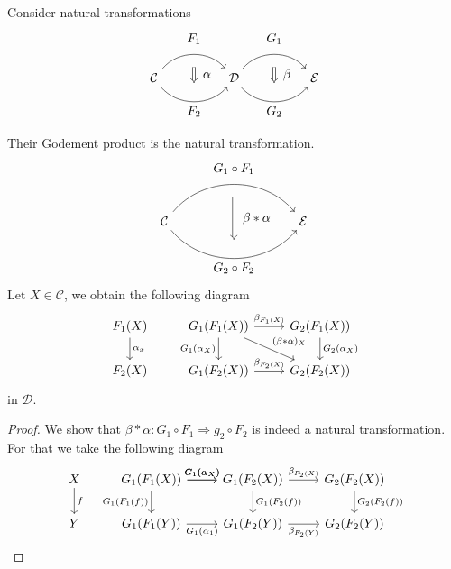 \begin{defi/prop}
    Consider natural transformations 
    \[
    \begin{tikzcd}[column sep=huge]	
    \mathcal{C}
    	\arrow[bend left=50]{r}[name=U,label=above:$F_1$]{}
    	\arrow[bend right=50]{r}[name=D,label=below:$F_2$]{}
    &
    \mathcal{D}
    \arrow[shorten <=10pt,shorten >=10pt,Rightarrow,to path={(U) -- node[label=right:$\alpha$] {} (D)}]{}
    	\arrow[bend left=50]{r}[name=U',label=above:$G_1$]{}
    	\arrow[bend right=50]{r}[name=D',label=below:$G_2$]{}
	&
	\mathcal{E} 
    \arrow[shorten <=10pt,shorten >=10pt,Rightarrow,to path={(U') -- node[label=right:$\beta$] {} (D')}]{}    	
    \end{tikzcd}
    \]
    
    Their Godement product is the natural transformation.
    \[
    \begin{tikzcd}[column sep=huge]	
    \mathcal{ C }
    	\arrow[bend left=50]{rr}[name=U,label=above:$G_1 \circ F_1$]{}
    	\arrow[bend right=50]{rr}[name=D,label=below:$G_2 \circ F_2$]{}
    &&
    \mathcal{E}
    \arrow[shorten <=10pt,shorten >=10pt,Rightarrow,to path={(U) -- node[label=right:$\beta * \alpha$] {} (D)}]{}
    \end{tikzcd}	
    \]
    Let $ X \in \mathcal{ C } $, we obtain the following diagram
    \[
    \begin{tikzcd}
        F_1 ( X ) 
        \ar[d, " \alpha_x "]
        &
        G_1 ( F_1 ( X ) ) 
        \ar[d, " G_1 ( \alpha_X ) "']
        \ar[rd, " {( \beta * \alpha )_X} "]
        \ar[r , " \beta_{ F_1 ( X ) } "]
        & 
        G_2 ( F_1 ( X ) )
        \ar[d, " G_2 ( \alpha_X ) "]
        \\
        F_2 ( X ) 
        &
        G_1 ( F_2 ( X ) ) 
        \ar[ r, " \beta_{ F_2 ( X ) }"]
        &
        G_2 ( F_2 ( X ) ) 
    \end{tikzcd}    
    \]
    in $ \mathcal{ D } $.
\end{defi/prop}

\begin{proof}
    We show that $ \beta * \alpha \colon G_1 \circ F_1 \Rightarrow g_2 \circ F_2 $ is indeed a natural transformation. 
    For that we take the following diagram 
     \[
     \begin{tikzcd}
         X
         \ar[d, "f"]
         &
         G_1 ( F_1 ( X ) ) 
         \ar[r , " G_1 ( \alpha_X ) "]
         \ar[r, " G_1 ( \alpha_X ) "]
         \ar[d, " G_1 ( F_1 ( f ) ) "']
         &
         G_1 ( F_2 ( X ) ) 
         \ar[ r, " \beta_{ F_2 ( X ) } "]
         \ar[d, " G_1 ( F_2 ( f ) ) "]
         & 
         G_2 ( F_2 ( X ) )
         \ar[d, " G_2 ( F_2 ( f ) ) "]
         \\
         Y
         &
         G_1 ( F_1 ( Y ) )
         \ar[ r , " G_1 ( \alpha_1 ) "']
         &
         G_1 ( F_2 ( Y ) ) 
         \ar[ r, " {\beta_{ F_2 ( Y ) }}"']
         & 
         G_2 ( F_2 ( Y ) ) 
     \end{tikzcd}
     \]
\end{proof}

